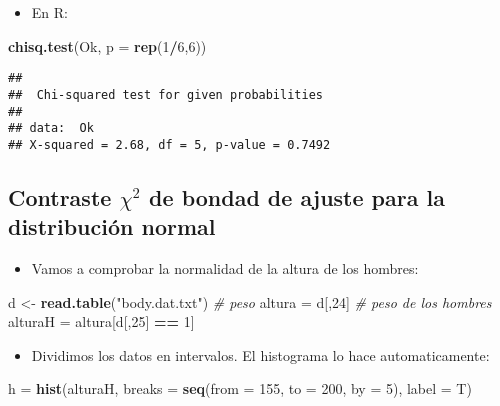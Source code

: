 \documentclass[]{article}
\newenvironment{Shaded}{\begin{snugshade}}{\end{snugshade}}
\newcommand{\KeywordTok}[1]{\textcolor[rgb]{0.13,0.29,0.53}{\textbf{#1}}}
\newcommand{\DataTypeTok}[1]{\textcolor[rgb]{0.13,0.29,0.53}{#1}}
\newcommand{\DecValTok}[1]{\textcolor[rgb]{0.00,0.00,0.81}{#1}}
\newcommand{\StringTok}[1]{\textcolor[rgb]{0.31,0.60,0.02}{#1}}
\newcommand{\CommentTok}[1]{\textcolor[rgb]{0.56,0.35,0.01}{\textit{#1}}}
\newcommand{\OperatorTok}[1]{\textcolor[rgb]{0.81,0.36,0.00}{\textbf{#1}}}
\newcommand{\NormalTok}[1]{#1}
\providecommand{\tightlist}{%
  \setlength{\itemsep}{0pt}\setlength{\parskip}{0pt}}
\begin{document}
\begin{itemize}
\tightlist
\item
  En R:
\end{itemize}

\begin{Shaded}
\begin{Highlighting}[]
\KeywordTok{chisq.test}\NormalTok{(Ok, }\DataTypeTok{p =} \KeywordTok{rep}\NormalTok{(}\DecValTok{1}\OperatorTok{/}\DecValTok{6}\NormalTok{,}\DecValTok{6}\NormalTok{))}
\end{Highlighting}
\end{Shaded}

\begin{verbatim}
## 
##  Chi-squared test for given probabilities
## 
## data:  Ok
## X-squared = 2.68, df = 5, p-value = 0.7492
\end{verbatim}

\subsection{\texorpdfstring{Contraste \(\chi^2\) de bondad de ajuste
para la distribución
normal}{Contraste \textbackslash{}chi\^{}2 de bondad de ajuste para la distribución normal}}\label{contraste-chi2-de-bondad-de-ajuste-para-la-distribucion-normal}

\begin{itemize}
\tightlist
\item
  Vamos a comprobar la normalidad de la altura de los hombres:
\end{itemize}

\begin{Shaded}
\begin{Highlighting}[]
\NormalTok{d <-}\StringTok{ }\KeywordTok{read.table}\NormalTok{(}\StringTok{"body.dat.txt"}\NormalTok{)}
\CommentTok{# peso}
\NormalTok{altura =}\StringTok{ }\NormalTok{d[,}\DecValTok{24}\NormalTok{]}
\CommentTok{# peso de los hombres}
\NormalTok{alturaH =}\StringTok{ }\NormalTok{altura[d[,}\DecValTok{25}\NormalTok{] }\OperatorTok{==}\StringTok{ }\DecValTok{1}\NormalTok{]}
\end{Highlighting}
\end{Shaded}

\begin{itemize}
\tightlist
\item
  Dividimos los datos en intervalos. El histograma lo hace
  automaticamente:
\end{itemize}

\begin{Shaded}
\begin{Highlighting}[]
\NormalTok{h =}\StringTok{ }\KeywordTok{hist}\NormalTok{(alturaH, }\DataTypeTok{breaks =} \KeywordTok{seq}\NormalTok{(}\DataTypeTok{from =} \DecValTok{155}\NormalTok{, }\DataTypeTok{to =} \DecValTok{200}\NormalTok{, }\DataTypeTok{by =} \DecValTok{5}\NormalTok{), }\DataTypeTok{label =}\NormalTok{ T)}
\end{Highlighting}
\end{Shaded}
\end{document}
